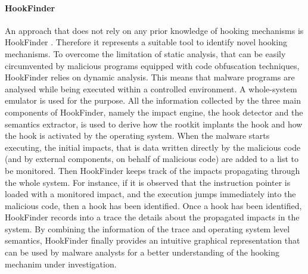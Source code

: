 \paragraph{HookFinder}
An approach that does not rely on any prior knowledge of hooking mechanisms is HookFinder \cite{hookfinder}. Therefore it represents a suitable tool to identify novel hooking mechanisms. To overcome the limitation of static analysis, that can be easily circumvented by malicious programs equipped with code obfuscation techniques, HookFinder relies on dynamic analysis. This means that malware programs are analysed while being executed within a controlled environment. A whole-system emulator is used for the purpose. All the information collected by the three main components of HookFinder, namely the impact engine, the hook detector and the semantics extractor, is used to derive how the rootkit implants the hook and how the hook is activated by the operating system. When the malware starts executing, the initial impacts, that is data written directly by the malicious code (and by external components, on behalf of malicious code) are added to a list to be monitored. Then HookFinder keeps track of the impacts propagating through the whole system. For instance, if it is observed that the instruction pointer is loaded with a monitored impact, and the execution jumps immediately into the malicious code, then a hook has been identified.
Once a hook has been identified, HookFinder records into a trace the details about the propagated impacts in the system. By combining the information of the trace and operating system level semantics, HookFinder finally provides an intuitive graphical representation that can be used by malware analysts for a better understanding of the hooking mechanim under investigation.



